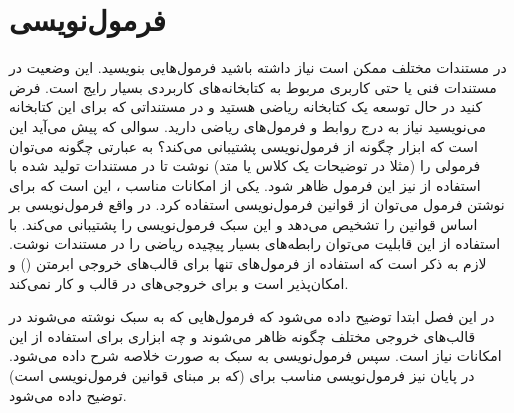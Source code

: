%
% 
% 
% 
%
\chapter{فرمول‌نویسی}

در مستندات مختلف ممکن است نیاز داشته باشید فرمول‌هایی بنویسید. این وضعیت در
مستندات فنی یا حتی کاربری مربوط به کتابخانه‌های کاربردی بسیار رایج است. فرض کنید
در حال توسعه یک کتابخانه ریاضی هستید و در مستنداتی که برای این کتابخانه
می‌نویسید نیاز به درج روابط و فرمول‌های ریاضی دارید. سوالی که پیش می‌آید این است
که ابزار  چگونه از فرمول‌نویسی پشتیبانی می‌کند؟ به عبارتی چگونه
می‌توان فرمولی را (مثلا در توضیحات یک کلاس یا متد) نوشت تا در مستندات تولید شده
با استفاده از  نیز این فرمول ظاهر شود.
یکی از امکانات مناسب ، این است که برای نوشتن فرمول می‌توان از قوانین
فرمول‌نویسی \lr{\LaTeX} استفاده کرد. در واقع  فرمول‌نویسی بر اساس قوانین
\lr{\LaTeX} را تشخیص می‌دهد و این سبک فرمول‌نویسی را پشتیبانی می‌کند.
با استفاده از این قابلیت می‌توان رابطه‌های بسیار پیچیده ریاضی را در مستندات
نوشت. لازم به ذکر است که استفاده از فرمول‌های \lr{\LaTeX} تنها برای قالب‌های خروجی
ابرمتن () و \lr{\LaTeX} امکان‌پذیر است و برای خروجی‌های در قالب  و
 کار نمی‌کند.

در این فصل ابتدا توضیح داده می‌شود که فرمول‌هایی که به سبک \lr{\LaTeX} نوشته می‌شوند
در قالب‌های خروجی مختلف چگونه ظاهر می‌شوند و چه ابزاری برای استفاده از این
امکانات نیاز است. سپس فرمول‌نویسی به سبک \lr{\LaTeX} به صورت خلاصه شرح داده می‌شود.
در پایان نیز فرمول‌نویسی مناسب برای  (که بر مبنای قوانین فرمول‌نویسی
\lr{\LaTeX} است) توضیح داده می‌شود.




